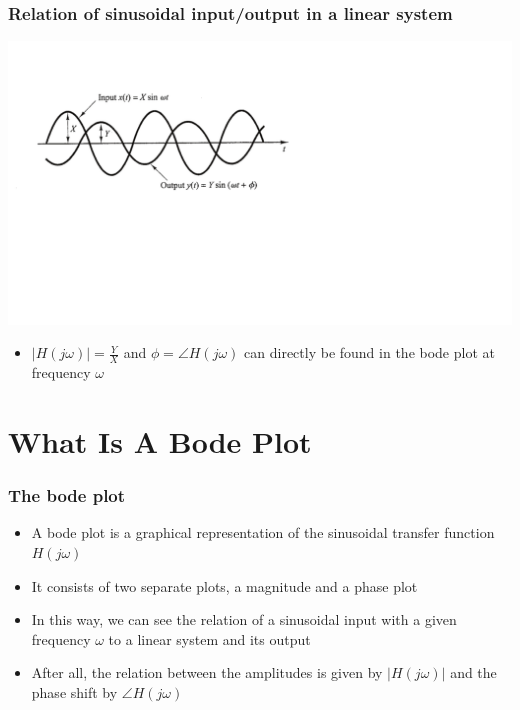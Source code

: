 \begin{frame}
\frametitle{Relation of sinusoidal input/output in a linear system}


\includegraphics[scale=0.5]{IOSinus}


\begin{itemize}
\item $|H(j\omega)| = \frac{Y}{X}$ and $\phi = \angle H(j\omega)$ can directly be found in the bode plot at frequency $\omega$
\end{itemize}

\end{frame}

\section{What Is A Bode Plot}

\begin{frame}
\frametitle{The bode plot}
\begin{definition}
	\begin{itemize}
		\item A bode plot is a graphical representation of the sinusoidal transfer function $H(j\omega)$
		\item It consists of two separate plots, a magnitude and a phase plot
		\item In this way, we can see the relation of a sinusoidal input with a given frequency $\omega$ to a linear system and its output
		\item After all, the relation between the amplitudes is given by $|H(j\omega)|$ and the phase shift by $\angle H(j\omega)$
		
	\end{itemize}
\end{definition}



\end{frame}


